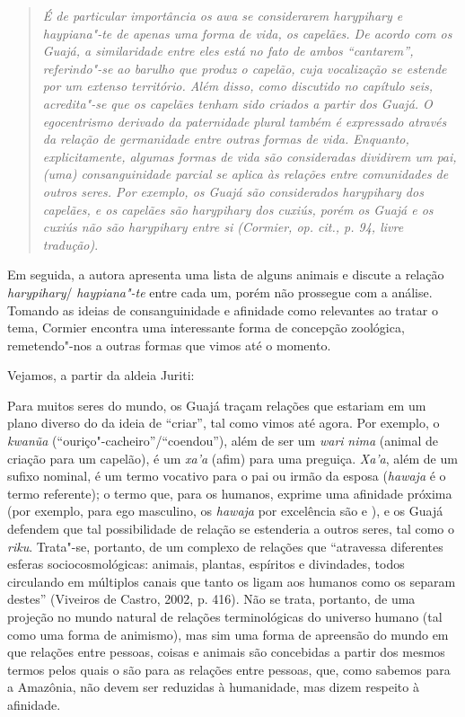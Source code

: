 \begin{quote}
\emph{É de particular importância os \emph{awa} se considerarem
\emph{harypihary} e \emph{haypiana"-te} de apenas uma forma de vida, os
capelães. De acordo com os Guajá, a similaridade entre eles está no fato
de ambos ``cantarem'', referindo"-se ao barulho que produz o capelão, cuja
vocalização se estende por um extenso território. Além disso, como
discutido no capítulo seis, acredita"-se que os capelães tenham sido
criados a partir dos Guajá. O egocentrismo derivado da paternidade
plural também é expressado através da relação de germanidade entre
outras formas de vida. Enquanto, explicitamente, algumas formas de vida
são consideradas dividirem um pai, (uma) consanguinidade parcial se
aplica às relações entre comunidades de outros seres. Por exemplo, os
Guajá são considerados \emph{harypihary} dos capelães, e os capelães são
\emph{harypihary} dos cuxiús, porém os Guajá e os cuxiús não são
\emph{harypihary} entre si (Cormier, \emph{op. cit}., p. 94, livre tradução)}.
\end{quote}

Em seguida, a autora apresenta uma lista de alguns animais e discute a
relação \emph{harypihary}/ \emph{haypiana"-te} entre cada um, porém não
prossegue com a análise. Tomando as ideias de consanguinidade e
afinidade como relevantes ao tratar o tema, Cormier encontra uma
interessante forma de concepção zoológica, remetendo"-nos a outras formas
que vimos até o momento.

Vejamos, a partir da aldeia Juriti:

Para muitos seres do mundo, os Guajá traçam relações que estariam em um
plano diverso do da ideia de ``criar'', tal como vimos até agora. Por
exemplo, o \emph{kwanũa} (``ouriço"-cacheiro''/``coendou''), além de ser um
\emph{wari} \emph{nima} (animal de criação para um capelão), é um
\emph{xa'a} (afim) para uma preguiça. \emph{Xa'a}, além de um sufixo
nominal, é um termo vocativo para o pai ou irmão da esposa
(\emph{hawaja} é o termo referente); o termo que, para os humanos,
exprime uma afinidade próxima (por exemplo, para ego masculino, os
\emph{hawaja} por excelência são  e ), e os Guajá defendem que tal
possibilidade de relação se estenderia a outros seres, tal como o
\emph{riku}. Trata"-se, portanto, de um complexo de relações que
``atravessa diferentes esferas sociocosmológicas: animais, plantas,
espíritos e divindades, todos circulando em múltiplos canais que tanto
os ligam aos humanos como os separam destes'' (Viveiros de Castro, 2002,
p. 416). Não se trata, portanto, de uma projeção no mundo natural de
relações terminológicas do universo humano (tal como uma forma de
animismo), mas sim uma forma de apreensão do mundo em que relações entre
pessoas, coisas e animais são concebidas a partir dos mesmos termos
pelos quais o são para as relações entre pessoas, que, como sabemos para
a Amazônia, não devem ser reduzidas à humanidade, mas dizem respeito à
afinidade.

